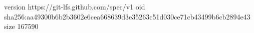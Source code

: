 version https://git-lfs.github.com/spec/v1
oid sha256:aa49300b6b2b3602e6cea668639d3e35263c51d030ce71cb43499b6cb2894e43
size 167590
